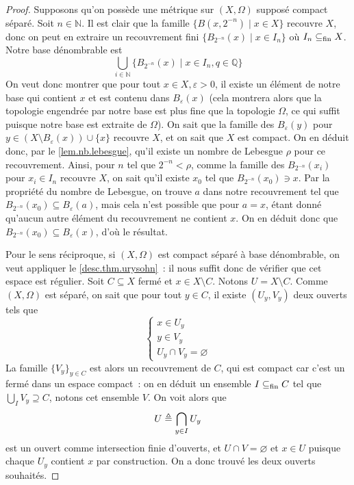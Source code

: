 \begin{proof}
  Supposons qu'on possède une métrique sur $(X,\Omega)$ supposé compact séparé.
  Soit $n\in \mathbb N$. Il est clair que la famille
  $\{B(x,2^{-n})\mid x \in X\}$ recouvre $X$, donc on peut en extraire un
  recouvrement fini $\{B_{2^{-n}}(x)\mid x \in I_n\}$ où $I_n\subseteq_{\mathrm{fin}} X$. Notre
  base dénombrable est
  \[\bigcup_{i\in \mathbb N} \{B_{2^{-n}}(x)\mid x \in I_n, q \in \mathbb Q\}\]
  On veut donc montrer que pour tout $x\in X, \varepsilon > 0$, il existe un
  élément de notre base qui contient $x$ et est contenu dans $B_\varepsilon(x)$
  (cela montrera alors que la topologie engendrée par notre base est plus
  fine que la topologie $\Omega$, ce qui suffit puisque notre base est
  extraite de $\Omega$). On sait que la famille des $B_\varepsilon(y)$ pour
  $y \in (X \setminus B_\varepsilon(x))\cup \{x\}$ recouvre $X$, et on sait que
  $X$ est compact. On en déduit donc, par le \cref{lem.nb.lebesgue}, qu'il
  existe un nombre de Lebesgue $\rho$ pour ce recouvrement. Ainsi, pour $n$ tel
  que $2^{-n} < \rho$, comme la famille des $B_{2^{-n}}(x_i)$ pour $x_i \in I_n$
  recouvre $X$, on sait qu'il existe $x_0$ tel que $B_{2^{-n}}(x_0) \ni x$. Par la
  propriété du nombre de Lebesgue, on trouve $a$ dans notre recouvrement tel que
  $B_{2^{-n}}(x_0)\subseteq B_\varepsilon(a)$, mais cela n'est possible que pour
  $a = x$, étant donné qu'aucun autre élément du recouvrement ne contient $x$.
  On en déduit donc que $B_{2^{-n}}(x_0)\subseteq B_\varepsilon(x)$, d'où le
  résultat.

  Pour le sens réciproque, si $(X,\Omega)$ est compact séparé à base
  dénombrable, on veut appliquer le \cref{desc.thm.urysohn}~: il nous suffit
  donc de vérifier que cet espace est régulier. Soit $C\subseteq X$ fermé et
  $x\in X \setminus C$. Notons $U = X \setminus C$. Comme $(X,\Omega)$ est
  séparé, on sait que pour tout $y \in C$, il existe $(U_y,V_y)$ deux ouverts
  tels que
  \[\left\{\begin{array}{c}
  x \in U_y\\
  y \in V_y\\
  U_y \cap V_y = \varnothing
  \end{array}\right.\]
  La famille $\{V_y\}_{y \in C}$ est alors un recouvrement de $C$, qui est
  compact car c'est un fermé dans un espace compact~: on en déduit un ensemble
  $I\subseteq_{\mathrm{fin}} C$ tel que $\bigcup_I V_y \supseteq C$, notons cet ensemble $V$.
  On voit alors que
  \[U \triangleq \bigcap_{y\in I} U_y\]
  est un ouvert comme intersection finie d'ouverts, et $U\cap V = \varnothing$
  et $x \in U$ puisque chaque $U_y$ contient $x$ par construction. On a donc
  trouvé les deux ouverts souhaités.


\end{proof}
